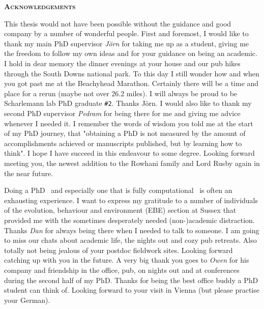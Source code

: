 \pagestyle{empty}%
%

\bigskip

\begin{center}
	\Huge \textsc{\textbf{Acknowledgements}}
\end{center}

This thesis would not have been possible without the guidance and good company by a number of wonderful people. First and foremost, I would like to thank my main PhD supervisor \textit{J\"{o}rn} for taking me up as a student, giving me the freedom to follow my own ideas and for your guidance on being an academic. I hold in dear memory the dinner evenings at your house and our pub hikes through the South Downs national park. To this day I still wonder how and when you got past me at the Beachyhead Marathon. Certainly there will be a time and place for a rerun (maybe not over 26.2 miles). I will always be proud to be Scharlemann lab PhD graduate \texttt{\#2}. Thanks J\"{o}rn.
I would also like to thank my second PhD supervisor \textit{Pedram} for being there for me and giving me advice whenever I needed it. I remember the words of wisdom you told me at the start of my PhD journey, that "obtaining a PhD is not measured by the amount of accomplishments achieved or manuscripts published, but by learning how to think". I hope I have succeed in this endeavour to some degree. Looking forward meeting you, the newest addition to the Rowhani family and Lord Rusby again in the near future. 

Doing a PhD \textendash\ and especially one that is fully computational \textendash\ is often an exhausting experience. I want to express my gratitude to a number of individuals of the evolution, behaviour and environment (EBE) section at Sussex that provided me with the sometimes desperately needed (non-)academic distraction. Thanks \textit{Dan} for always being there when I needed to talk to someone. I am going to miss our chats about academic life, the nights out and cozy pub retreats. Also totally not being jealous of your postdoc fieldwork sites. Looking forward catching up with you in the future. A very big thank you goes to \textit{Owen} for his company and friendship in the office, pub, on nights out and at conferences during the second half of my PhD. Thanks for being the best office buddy a PhD student can think of. Looking forward to your visit in Vienna (but please practise your German).

